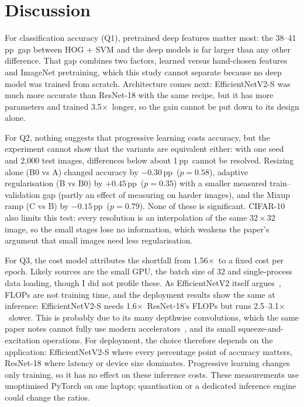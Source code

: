 \documentclass{COMPXXXX}
\newcommand{\pp}{\,pp}
\newcommand{\sx}{$\times$}
\begin{document}
\section{Discussion}
For classification accuracy (Q1), pretrained deep features matter most: the 38--41\pp\ gap between
HOG + SVM and the deep models is far larger than any other difference. That gap combines two factors,
learned versus hand-chosen features and ImageNet pretraining, which this study cannot separate because
no deep model was trained from scratch. Architecture comes next: EfficientNetV2-S was much more
accurate than ResNet-18 with the same recipe, but it has more parameters and trained 3.5\sx\ longer, so
the gain cannot be put down to its design alone.

For Q2, nothing suggests that progressive learning costs accuracy, but the experiment cannot show that
the variants are equivalent either: with one seed and 2{,}000 test images, differences below about
1\pp\ cannot be resolved. Resizing alone (B0 vs A) changed accuracy by $-0.30$\pp\ ($p=0.58$),
adaptive regularisation (B vs B0) by $+0.45$\pp\ ($p=0.35$) with a smaller measured train--validation
gap (partly an effect of measuring on harder images), and the Mixup ramp (C vs B) by $-0.15$\pp\
($p=0.79$). None of these is significant. CIFAR-10 also limits this test: every resolution is an
interpolation of the same $32{\times}32$ image, so the small stages lose no information, which weakens
the paper's argument that small images need less regularisation.

For Q3, the cost model attributes the shortfall from 1.56\sx\ to a fixed cost per epoch. Likely
sources are the small GPU, the batch size of 32 and single-process data loading, though I did not
profile these. As EfficientNetV2 itself argues~\cite{tan2021efficientnetv2}, FLOPs are not training
time, and the deployment results show the same at inference: EfficientNetV2-S needs 1.6\sx\
ResNet-18's FLOPs but runs 2.5--3.1\sx\ slower. This is probably due to its many depthwise
convolutions, which the same paper notes cannot fully use modern accelerators~\cite{tan2021efficientnetv2},
and its small squeeze-and-excitation operations. For deployment, the choice therefore depends on the
application: EfficientNetV2-S where every percentage point of accuracy matters, ResNet-18 where latency
or device size dominates. Progressive learning changes only training, so it has no effect on these
inference costs. These measurements use unoptimised PyTorch on one laptop; quantisation or a dedicated
inference engine could change the ratios.
\end{document}
